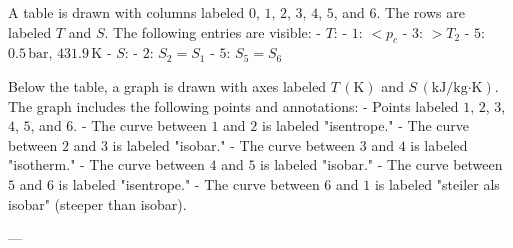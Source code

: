 A table is drawn with columns labeled \( 0 \), \( 1 \), \( 2 \), \( 3 \), \( 4 \), \( 5 \), and \( 6 \). The rows are labeled \( T \) and \( S \). The following entries are visible:  
- \( T \):  
  - \( 1 \): \( < p_c \)  
  - \( 3 \): \( > T_2 \)  
  - \( 5 \): \( 0.5 \, \text{bar}, \, 431.9 \, \text{K} \)  
- \( S \):  
  - \( 2 \): \( S_2 = S_1 \)  
  - \( 5 \): \( S_5 = S_6 \)  

Below the table, a graph is drawn with axes labeled \( T \, (\text{K}) \) and \( S \, (\text{kJ/kg·K}) \). The graph includes the following points and annotations:  
- Points labeled \( 1 \), \( 2 \), \( 3 \), \( 4 \), \( 5 \), and \( 6 \).  
- The curve between \( 1 \) and \( 2 \) is labeled "isentrope."  
- The curve between \( 2 \) and \( 3 \) is labeled "isobar."  
- The curve between \( 3 \) and \( 4 \) is labeled "isotherm."  
- The curve between \( 4 \) and \( 5 \) is labeled "isobar."  
- The curve between \( 5 \) and \( 6 \) is labeled "isentrope."  
- The curve between \( 6 \) and \( 1 \) is labeled "steiler als isobar" (steeper than isobar).  

---